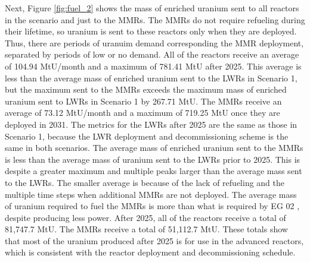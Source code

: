 Next, Figure \ref{fig:fuel_2} shows the mass of enriched uranium sent to all 
reactors in the scenario and just to the \glspl{MMR}. The \glspl{MMR} 
do not require refueling during their lifetime, so uranium is  
sent to these reactors only when they are deployed. Thus, there are periods
of uranuim demand corresponding the \gls{MMR} deployment, separated by periods
of low or no demand. All of the reactors receive an average of 104.94 
MtU/month and a maximum of 781.41 MtU after 2025. 
This average is less than the average mass of enriched uranium 
sent to the \glspl{LWR} in Scenario 1, but the maximum sent to the \glspl{MMR}
exceeds the maximum 
mass of enriched uranium sent to \glspl{LWR} in Scenario 1 by 267.71 MtU.
The \glspl{MMR} receive an average of 73.12 MtU/month and a maximum of 719.25 
MtU once they are deployed in 2031. The metrics for the \glspl{LWR} after 2025
are the same as those in Scenario 1, because the \gls{LWR} deployment and decommissioning 
scheme is the same in both scenarios.  The average 
mass of enriched uranium sent to the 
\glspl{MMR} is less than the average mass of uranium sent to the \glspl{LWR}
prior to 2025. This is despite a greater maximum and multiple peaks larger
than the
average mass sent to the \glspl{LWR}. The smaller average is because of the 
lack of refueling and the multiple time steps when additional 
\glspl{MMR} are not deployed. The average mass of uranium required to fuel 
the \glspl{MMR} is more than what is required by \gls{EG} 02 
\cite{wigeland_nuclear_2014}, despite producing less power. 
After 2025, all of the reactors receive a total of 81,747.7 MtU. The  
\glspl{MMR} receive a total of 51,112.7 MtU. These totals show that most 
of the uranium produced after 2025 is for use in the advanced reactors, 
which is consistent with the reactor deployment and decommissioning schedule. 


